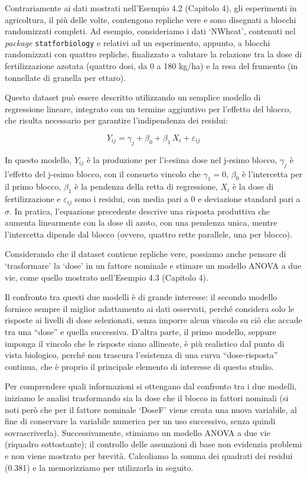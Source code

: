 \documentclass[
  12pt,
]{book}
\begin{document}
Contrariamente ai dati mostrati nell'Esempio 4.2 (Capitolo 4), gli esperimenti in agricoltura, il più delle volte, contengono repliche vere e sono disegnati a blocchi randomizzati completi. Ad esempio, consideriamo i dati `NWheat', contenuti nel \emph{package} \texttt{statforbiology} e relativi ad un esperimento, appunto, a blocchi randomizzati con quattro repliche, finalizzato a valutare la relazione tra la dose di fertilizzazione azotata (quattro dosi, da 0 a 180 kg/ha) e la resa del frumento (in tonnellate di granella per ettaro).

Questo dataset può essere descritto utilizzando un semplice modello di regressione lineare, integrato con un termine aggiuntivo per l'effetto del blocco, che risulta necessario per garantire l'indipendenza dei residui:

\[Y_{ij} = \gamma_j + \beta_0 + \beta_1 \, X_i + \varepsilon_{ij}\]

In questo modello, \(Y_{ij}\) è la produzione per l'i-esima dose nel j-esimo blocco, \(\gamma_j\) è l'effetto del j-esimo blocco, con il consueto vincolo che \(\gamma_1 = 0\), \(\beta_0\) è l'intercetta per il primo blocco, \(\beta_1\) è la pendenza della retta di regressione, \(X_i\) è la dose di fertilizzazione e \(\varepsilon_{ij}\) sono i residui, con media pari a 0 e deviazione standard pari a \(\sigma\). In pratica, l'equazione precedente descrive una risposta produttiva che aumenta linearmente con la dose di azoto, con una pendenza unica, mentre l'intercetta dipende dal blocco (ovvero, quattro rette parallele, una per blocco).

Considerando che il dataset contiene repliche vere, possiamo anche pensare di `trasformare' la `dose' in un fattore nominale e stimare un modello ANOVA a due vie, come quello mostrato nell'Esempio 4.3 (Capitolo 4).

Il confronto tra questi due modelli è di grande interesse: il secondo modello fornisce sempre il miglior adattamento ai dati osservati, perché considera solo le risposte ai livelli di dose selezionati, senza imporre alcun vincolo su ciò che accade tra una ``dose'' e quella successiva. D'altra parte, il primo modello, seppure imponga il vincolo che le risposte siano allineate, è più realistico dal punto di vista biologico, perché non trascura l'esistenza di una curva ``dose-risposta'' continua, che è proprio il principale elemento di interesse di questo studio.

Per comprendere quali informazioni si ottengano dal confronto tra i due modelli, iniziamo le analisi trasformando sia la dose che il blocco in fattori nominali (si noti però che per il fattore nominale `DoseF' viene creata una nuova variabile, al fine di conservare la variabile numerica per un uso successivo, senza quindi sovrascriverla). Successivamente, stimiamo un modello ANOVA a due vie (riquadro sottostante); il controllo delle assunzioni di base non evidenzia problemi e non viene mostrato per brevità. Calcoliamo la somma dei quadrati dei residui (0.381) e la memorizziamo per utilizzarla in seguito.
\end{document}

